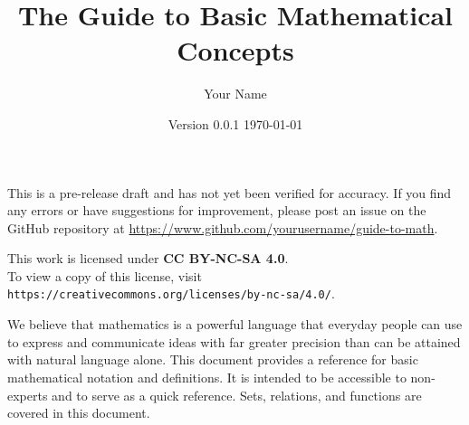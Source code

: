 \documentclass[letterpaper]{article}
\title{\sffamily\textbf{The Guide to Basic Mathematical Concepts}}
\author{\sffamily Your Name}
\date{Version 0.0.1 \quad \today}
\begin{document}
\maketitle

\vfill
\begin{warning}
  This is a pre-release draft and has not yet been verified for accuracy.
  If you find any errors or have suggestions for improvement, please post 
  an issue on the GitHub repository at
  \url{https://www.github.com/yourusername/guide-to-math}.
\end{warning}
\begin{center}
    {\small This work is licensed under \textbf{CC BY-NC-SA 4.0}.\\
    To view a copy of this license, visit \texttt{https://creativecommons.org/licenses/by-nc-sa/4.0/}.}
\end{center}

\newpage
\tableofcontents
\newpage

We believe that mathematics is a powerful language that everyday people can 
use to express and communicate ideas with far greater precision than can be 
attained with natural language alone. This document provides a reference for 
basic mathematical notation and definitions. It is intended to be accessible 
to non-experts and to serve as a quick reference. Sets, relations, and 
functions are covered in this document.








% 
% 
\end{document}

